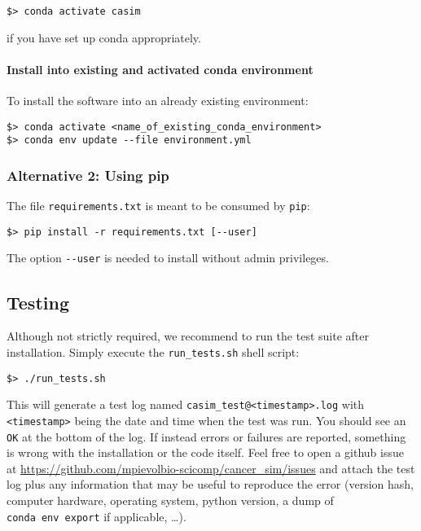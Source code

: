 \documentclass[]{article}
\let\oldparagraph\paragraph
\renewcommand{\paragraph}[1]{\oldparagraph{#1}\mbox{}}
\begin{document}
\begin{verbatim}
$> conda activate casim
\end{verbatim}

if you have set up conda appropriately.

\hypertarget{install-into-existing-and-activated-conda-environment}{%
\paragraph{Install into existing and activated conda
environment}\label{install-into-existing-and-activated-conda-environment}}

To install the software into an already existing environment:

\begin{verbatim}
$> conda activate <name_of_existing_conda_environment>
$> conda env update --file environment.yml
\end{verbatim}

\hypertarget{alternative-2-using-pip}{%
\subsubsection{Alternative 2: Using pip}\label{alternative-2-using-pip}}

The file \texttt{requirements.txt} is meant to be consumed by
\texttt{pip}:

\begin{verbatim}
$> pip install -r requirements.txt [--user]
\end{verbatim}

The option \texttt{-\/-user} is needed to install without admin
privileges.

\hypertarget{testing}{%
\subsection{Testing}\label{testing}}

Although not strictly required, we recommend to run the test suite after
installation. Simply execute the \texttt{run\_tests.sh} shell script:

\begin{verbatim}
$> ./run_tests.sh
\end{verbatim}

This will generate a test log named
\texttt{casim\_test@\textless{}timestamp\textgreater{}.log} with
\texttt{\textless{}timestamp\textgreater{}} being the date and time when
the test was run. You should see an \texttt{OK} at the bottom of the
log. If instead errors or failures are reported, something is wrong with
the installation or the code itself. Feel free to open a github issue at
\url{https://github.com/mpievolbio-scicomp/cancer_sim/issues} and attach
the test log plus any information that may be useful to reproduce the
error (version hash, computer hardware, operating system, python
version, a dump of \texttt{conda\ env\ export} if applicable, \ldots{}).
\end{document}
